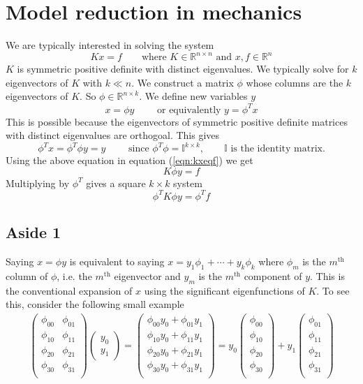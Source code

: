 \documentclass{article}
\newcommand{\beq}{\begin{equation}}
\newcommand{\eeq}{\end{equation}}
\newcommand{\ber}{\begin{eqnarray}}
\newcommand{\eer}{\end{eqnarray}}
\begin{document}
\section{Model reduction in mechanics}
We are typically interested in solving the system
\beq
\label{eqn:kxeqf}
Kx = f \qquad \text{where } K\in\mathbb{R}^{n\times{n}} \text{ and } x,f \in \mathbb{R}^n
\eeq
$K$ is symmetric positive definite with distinct eigenvalues. We typically solve for $k$ eigenvectors of $K$ with $k \ll n$. We construct a matrix $\phi$ whose columns are the $k$ eigenvectors of $K$. So $\phi \in \mathbb{R}^{n\times{k}}$. We define new variables $y$
\beq
x = \phi{y} \qquad \text{ or equivalently } y = \phi^Tx
\eeq
This is possible because the eigenvectors of symmetric positive definite matrices with distinct eigenvalues are orthogoal. This gives
\beq
\phi^Tx = \phi^T\phi y = y \qquad \text{ since } \phi^T\phi = \mathbb{I}^{k\times{k}}, \qquad \mathbb{I} \text{ is the identity matrix.}
\eeq
Using the above equation in equation (\ref{eqn:kxeqf}) we get
\beq
K\phi{y} = f
\eeq
Multiplying by $\phi^T$ gives a square $k\times{k}$ system
\beq
\phi^TK\phi{y} = \phi^Tf
\eeq
\subsection{Aside 1}
Saying $x=\phi{y}$ is equivalent to saying $x=y_{1}\phi_{1}+\cdots+y_{k}\phi_{k}$ where $\phi_m$ is the $m^{\text{th}}$ column of $\phi$, i.e. the $m^{\text{th}}$ eigenvector and $y_m$ is the $m^{\text{th}}$ component of $y$. This is the conventional expansion of $x$ using the significant eigenfunctions of $K$. To see this, consider the following small example
\ber
\begin{pmatrix}
  \phi_{00} & \phi_{01} \\
  \phi_{10} & \phi_{11} \\
  \phi_{20} & \phi_{21} \\
  \phi_{30} & \phi_{31} \\
\end{pmatrix}
\begin{pmatrix}
  y_0 \\
  y_1
\end{pmatrix}
=\begin{pmatrix}
  \phi_{00}y_0 + \phi_{01}y_1 \\
  \phi_{10}y_0 + \phi_{11}y_1 \\
  \phi_{20}y_0 + \phi_{21}y_1 \\
  \phi_{30}y_0 + \phi_{31}y_1\\
\end{pmatrix}
=y_0\begin{pmatrix}
  \phi_{00}  \\
  \phi_{10}  \\
  \phi_{20}  \\
  \phi_{30}  \\
\end{pmatrix}
+
y_1\begin{pmatrix}
  \phi_{01}  \\
  \phi_{11}  \\
  \phi_{21}  \\
  \phi_{31}  \\
\end{pmatrix}
\eer
\end{document}
